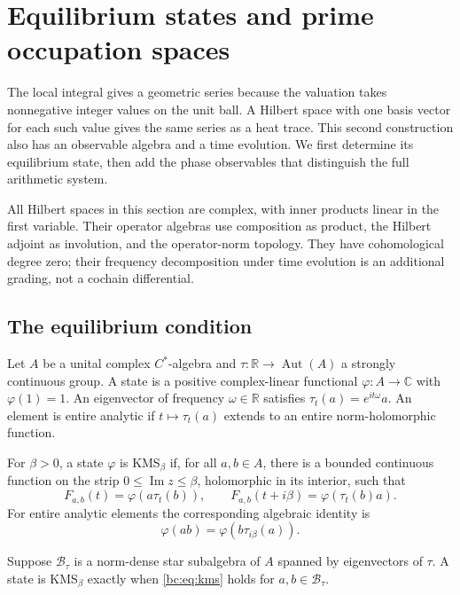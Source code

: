 \section{Equilibrium states and prime occupation spaces}
\label{sec:equilibrium}

The local integral gives a geometric series because the valuation takes
nonnegative integer values on the unit ball. A Hilbert space with one
basis vector for each such value gives the same series as a heat trace.
This second construction also has an observable algebra and a time
evolution. We first determine its equilibrium state, then add the phase
observables that distinguish the full arithmetic system.

All Hilbert spaces in this section are complex, with inner products linear
in the first variable. Their operator algebras use composition as product,
the Hilbert adjoint as involution, and the operator-norm topology.
They have cohomological degree zero; their frequency decomposition under
time evolution is an additional grading, not a cochain differential.

\subsection{The equilibrium condition}

Let \(A\) be a unital complex \(C^*\)-algebra and
\(\tau:\mathbb R\to\operatorname{Aut}(A)\) a strongly continuous group.
A state is a positive complex-linear functional \(\varphi:A\to\mathbb C\)
with \(\varphi(1)=1\). An eigenvector of frequency \(\omega\in\mathbb R\)
satisfies \(\tau_t(a)=e^{it\omega}a\). An element is entire analytic if
\(t\mapsto\tau_t(a)\) extends to an entire norm-holomorphic function.

\begin{definition}\label{bc:def:kms}
For \(\beta>0\), a state \(\varphi\) is KMS\(_\beta\) if, for all
\(a,b\in A\), there is a bounded continuous function on the strip
\(0\leq\operatorname{Im}z\leq\beta\), holomorphic in its interior, such that
\[
 F_{a,b}(t)=\varphi(a\tau_t(b)),\qquad
 F_{a,b}(t+i\beta)=\varphi(\tau_t(b)a).
\]
For entire analytic elements the corresponding algebraic identity is
\begin{equation}\label{bc:eq:kms}
 \varphi(ab)=\varphi(b\tau_{i\beta}(a)).
\end{equation}
\end{definition}

\begin{lemma}\label{bc:lem:analytic}
Suppose \(\mathcal B_\tau\) is a norm-dense star subalgebra of \(A\)
spanned by eigenvectors of \(\tau\). A state is KMS\(_\beta\) exactly when
\eqref{bc:eq:kms} holds for \(a,b\in\mathcal B_\tau\).
\end{lemma}

